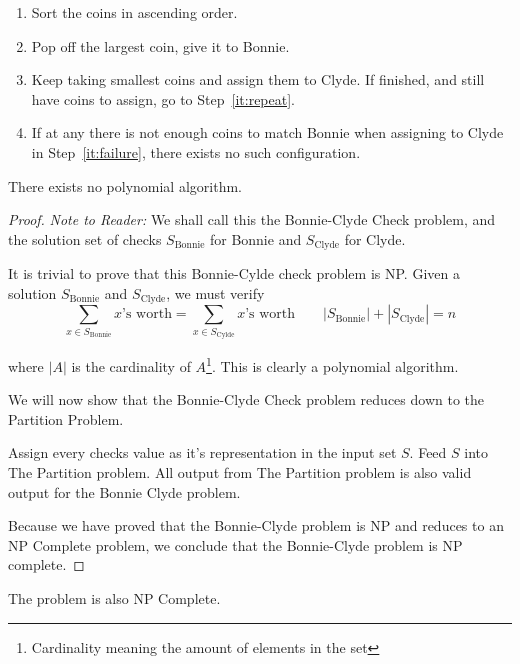 \documentclass[12pt,listof=totoc,toc=sectionentrywithdots]{scrartcl}
\begin{document}
\begin{enumerate}
    \item Sort the coins in ascending order.
    \item\label{it:repeat} Pop off the largest coin, give it to Bonnie.
    \item\label{it:failure} Keep taking smallest coins and assign them to Clyde. If finished, and still have coins to assign, go to Step~\ref{it:repeat}.
    \item If at any there is not enough coins to match Bonnie when assigning to Clyde in Step~\ref{it:failure}, there exists no such configuration.
\end{enumerate}



\subproblem{}
There exists no polynomial algorithm.

\begin{proof}
    \textit{Note to Reader:} We shall call this the Bonnie-Clyde Check problem, and the solution set of checks $S_\text{Bonnie}$ for Bonnie and $S_\text{Clyde}$ for Clyde.

    It is trivial to prove that this Bonnie-Cylde check problem is NP. Given a solution $S_\text{Bonnie}$ and $S_\text{Clyde}$, we must verify
    \begin{equation*}
        \sum_{x \in S_\text{Bonnie}} \text{$x$'s worth} = \sum_{x \in S_\text{Cylde}} \text{$x$'s worth} \qquad
        |S_\text{Bonnie}| + |S_\text{Clyde}| = n
    \end{equation*}

where $|A|$ is the cardinality of $A$\footnote{Cardinality meaning the amount of elements in the set}. This is clearly a polynomial algorithm.

    We will now show that the Bonnie-Clyde Check problem reduces down to the Partition Problem.

    Assign every checks value as it's representation in the input set $S$. Feed $S$ into The Partition problem. All output from The Partition problem is also valid output for the Bonnie Clyde problem.

    Because we have proved that the Bonnie-Clyde problem is NP and reduces to an NP Complete problem, we conclude that the Bonnie-Clyde problem is NP complete.
\end{proof}

\subproblem{}
The problem is also NP Complete.
\end{document}
